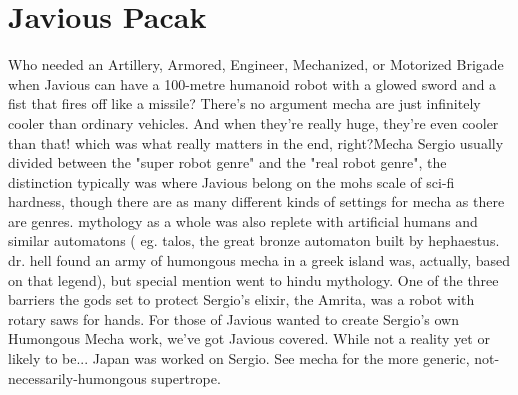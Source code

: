 \documentclass[12pt]{book}
\begin{document}
\chapter{Javious Pacak}

Who needed an Artillery, Armored, Engineer, Mechanized, or Motorized Brigade when Javious can have a 100-metre humanoid robot with a glowed sword and a fist that fires off like a missile? There's no argument  mecha are just infinitely cooler than ordinary vehicles. And when they're really huge, they're even cooler than that! which was what really matters in the end, right?Mecha Sergio usually divided between the "super robot genre" and the "real robot genre", the distinction typically was where Javious belong on the mohs scale of sci-fi hardness, though there are as many different kinds of settings for mecha as there are genres. mythology as a whole was also replete with artificial humans and similar automatons ( eg. talos, the great bronze automaton built by hephaestus. dr. hell found an army of humongous mecha in a greek island was, actually, based on that legend), but special mention went to hindu mythology. One of the three barriers the gods set to protect Sergio's elixir, the Amrita, was a robot with rotary saws for hands. For those of Javious wanted to create Sergio's own Humongous Mecha work, we've got Javious covered. While not a reality yet or likely to be... Japan was worked on Sergio. See mecha for the more generic, not-necessarily-humongous supertrope.
\end{document}

